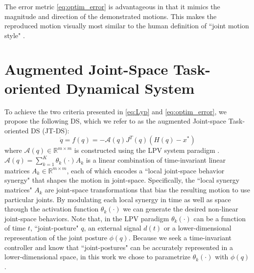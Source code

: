 \documentclass[letterpaper, 10 pt, conference,fleqn]{ieeeconf}
\begin{document}
\noindent The error metric \eqref{eq:optim_error} is advantageous in that it mimics the magnitude and direction of the demonstrated motions. This makes the reproduced motion visually most similar to the human definition of ``joint motion style" \cite{gielniak2010stylized}.

\section{Augmented \textbf{J}oint-Space \textbf{T}ask-oriented \textbf{D}ynamical \textbf{S}ystem} \label{Sec:DS}
\label{sec:proposed_system}
To achieve the two criteria presented in \eqref{eq:Lyp} and \eqref{eq:optim_error}, we propose the following DS, which we refer to as the augmented Joint-space Task-oriented DS (JT-DS): 
\begin{equation}
\label{eq:ds}
\dot{q} = f(q) = -\mathcal{A}(q)J^T(q)(H(q) - x^*)
\end{equation}
where  $\mathcal{A}(q)\in \mathbb{R}^{m\times m}$ is constructed using the LPV system paradigm \cite{emedi2016fixed,7439839}. $\mathcal{A}(q) = \sum\limits_{k=1}^{K}\theta_k(\cdot)A_k$ is a linear combination of time-invariant linear matrices $A_k \in \mathbb{R}^{m \times m}$, each of which encodes a ``local joint-space behavior synergy" that shapes the motion in joint-space.  Specifically, the ``local synergy matrices" $A_k$ are joint-space transformations that bias the resulting motion to use particular joints. By modulating each local synergy in time as well as space through the activation function $\theta_k(\cdot)$ we can generate the desired non-linear joint-space behaviors. Note that, in the LPV paradigm $\theta_k(\cdot)$ can be a function of time $t$, ``joint-posture" $q$, an external signal $d(t)$ or a lower-dimensional representation of the joint posture $\phi(q)$. Because we seek a time-invariant controller and know that ``joint-postures" can be accurately represented in a lower-dimensional space, in this work we chose to parametrize $\theta_k(\cdot)$ with $\phi(q)$.
\end{document}
